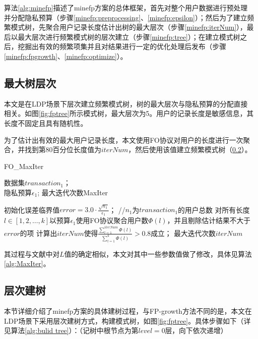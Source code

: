\documentclass[UTF8]{ctexart}
\begin{document}
算法\ref{alg:minefp}描述了minefp方案的总体框架，首先对整个用户数据进行预处理并分配隐私预算（步骤\ref{minefp:preprocessing}、\ref{minefp:epsilon}）；然后为了建立频繁模式树，先聚合用户记录长度估计出树的最大层次（步骤\ref{minefp:iterNum}），最后以最大层次进行频繁模式树的层次建立（步骤\ref{minefp:tree}）；在建立模式树之后，挖掘出有效的频繁项集并且对结果进行一定的优化处理后发布（步骤\ref{minefp:fpgrowth}、\ref{minefp:optimize}）。


\subsection{最大树层次}
\label{section:MaxIter}
本文是在LDP场景下层次建立频繁模式树，树的最大层次与隐私预算的分配直接相关。如图\ref{fig:fptree}所示模式树，最大层次为5。用户的记录长度是敏感信息，其长度不固定且具有随机性。

为了估计出有效的最大用户记录长度，本文使用FO协议对用户的长度进行一次聚合，并找到第80百分位长度值为$iterNum$，然后使用该值建立频繁模式树（\ref{section:buildTree}）。

\begin{algorithm}[ht]
\caption{FO\_MaxIter}
\label{alg:MaxIter}
\begin{algorithmic}[1]
\REQUIRE 数据集$transaction_1$；\\
隐私预算$\epsilon_1$;
\ENSURE 最大迭代次数MaxIter

\STATE 初始化误差临界值$error = 3.0 \cdot \frac{\sqrt{n_1}}{\epsilon_1}$； //$n_1$为$transaction_1$的用户总数
\label{T threshold}
\STATE 对所有长度$l \in [1,2,\ldots,k]$以预算$\epsilon_1$使用FO协议聚合用户数$\Phi(l)$，并且剔除估计结果不大于$error$的项
\STATE 计算出$iterNum$使得$\frac{ \sum_{l=1}^{iterNum} \Phi(l)}{\sum_{l=1}^k \Phi(l)} > 0.8$成立；
\label{gamma=0.8}
\RETURN 最大迭代次数$iterNum$
\end{algorithmic}
\end{algorithm}

其过程与文献\cite{wang2018locally}中对$L$值的确定相似，本文对其中一些参数值做了修改，具体见算法\ref{alg:MaxIter}。

\subsection{层次建树}
\label{section:buildTree}
  本节详细介绍了minefp方案的具体建树过程，与FP-growth方法不同的是，本文在LDP场景下采用层次建树方式，构建模式树，如图\ref{fig:fptree}。具体步骤如下（详见算法\ref{alg:bulid tree}）：（记树中根节点为第$level = 0$层，向下依次递增）
\end{document}
